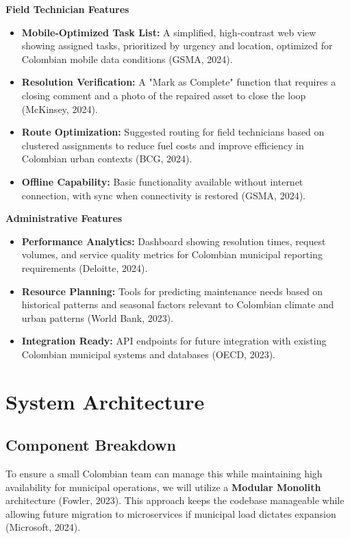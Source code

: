 \documentclass[12pt,a4paper]{article}
\begin{document}
\textbf{Field Technician Features}
\begin{itemize}
    \item \textbf{Mobile-Optimized Task List:} A simplified, high-contrast web view showing assigned tasks, prioritized by urgency and location, optimized for Colombian mobile data conditions (GSMA, 2024).
    \item \textbf{Resolution Verification:} A "Mark as Complete" function that requires a closing comment and a photo of the repaired asset to close the loop (McKinsey, 2024).
    \item \textbf{Route Optimization:} Suggested routing for field technicians based on clustered assignments to reduce fuel costs and improve efficiency in Colombian urban contexts (BCG, 2024).
    \item \textbf{Offline Capability:} Basic functionality available without internet connection, with sync when connectivity is restored (GSMA, 2024).
\end{itemize}

\textbf{Administrative Features}
\begin{itemize}
    \item \textbf{Performance Analytics:} Dashboard showing resolution times, request volumes, and service quality metrics for Colombian municipal reporting requirements (Deloitte, 2024).
    \item \textbf{Resource Planning:} Tools for predicting maintenance needs based on historical patterns and seasonal factors relevant to Colombian climate and urban patterns (World Bank, 2023).
    \item \textbf{Integration Ready:} API endpoints for future integration with existing Colombian municipal systems and databases (OECD, 2023).
\end{itemize}

\section{System Architecture}

\subsection{Component Breakdown}

To ensure a small Colombian team can manage this while maintaining high availability for municipal operations, we will utilize a \textbf{Modular Monolith} architecture (Fowler, 2023). This approach keeps the codebase manageable while allowing future migration to microservices if municipal load dictates expansion (Microsoft, 2024).
\end{document}
